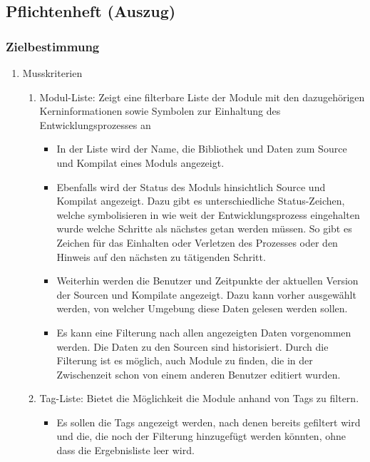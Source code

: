\subsection{Pflichtenheft (Auszug)}
\label{app:Pflichtenheft}

\subsubsection*{Zielbestimmung}

\begin{enumerate}[itemsep=0em,partopsep=0em,parsep=0em,topsep=0em]
\item Musskriterien %
	\begin{enumerate}
	\item Modul-Liste: Zeigt eine filterbare Liste der Module mit den dazugehörigen Kerninformationen sowie Symbolen zur Einhaltung des Entwicklungsprozesses an
		\begin{itemize}
		\item In der Liste wird der Name, die Bibliothek und Daten zum Source und Kompilat eines Moduls angezeigt.
		\item Ebenfalls wird der Status des Moduls hinsichtlich Source und Kompilat angezeigt. Dazu gibt es unterschiedliche Status-Zeichen, welche symbolisieren in wie weit der Entwicklungsprozess eingehalten wurde \bzw welche Schritte als nächstes getan werden müssen. So gibt es \zB Zeichen für das Einhalten oder Verletzen des Prozesses oder den Hinweis auf den nächsten zu tätigenden Schritt. 
		\item Weiterhin werden die Benutzer und Zeitpunkte der aktuellen Version der Sourcen und Kompilate angezeigt. Dazu kann vorher ausgewählt werden, von welcher Umgebung diese Daten gelesen werden sollen. 
		\item Es kann eine Filterung nach allen angezeigten Daten vorgenommen werden. Die Daten zu den Sourcen sind historisiert. Durch die Filterung ist es möglich, auch Module zu finden, die in der Zwischenzeit schon von einem anderen Benutzer editiert wurden.
		\end{itemize}
	\item Tag-Liste: Bietet die Möglichkeit die Module anhand von Tags zu filtern. 
		\begin{itemize}
		\item Es sollen die Tags angezeigt werden, nach denen bereits gefiltert wird und die, die noch der Filterung hinzugefügt werden könnten, ohne dass die Ergebnisliste leer wird.

\end{itemize}
\end{enumerate}
\end{enumerate}
